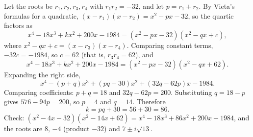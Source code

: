 Let the roots be $r_1,r_2,r_3,r_4$ with $r_1r_2=-32$, and let $p=r_1+r_2$. By Vieta's formulas for a quadratic, $(x-r_1)(x-r_2)=x^2-px-32$, so the quartic factors as
\[x^4-18x^3+kx^2+200x-1984=\left(x^2-px-32\right)\left(x^2-qx+c\right),\]
where $x^2-qx+c=(x-r_3)(x-r_4)$. Comparing constant terms, $-32c=-1984$, so $c=62$ (that is, $r_3r_4=62$), and
\[x^4-18x^3+kx^2+200x-1984=\left(x^2-px-32\right)\left(x^2-qx+62\right).\]
Expanding the right side,
\[x^4-(p+q)x^3+(pq+30)x^2+(32q-62p)x-1984 .\]
Comparing coefficients: $p+q=18$ and $32q-62p=200$. Substituting $q=18-p$ gives $576-94p=200$, so $p=4$ and $q=14$. Therefore
\[k=pq+30=56+30=\boxed{86}.\]
Check: $\left(x^2-4x-32\right)\left(x^2-14x+62\right)=x^4-18x^3+86x^2+200x-1984$, and the roots are $8$, $-4$ (product $-32$) and $7\pm i\sqrt{13}$.
